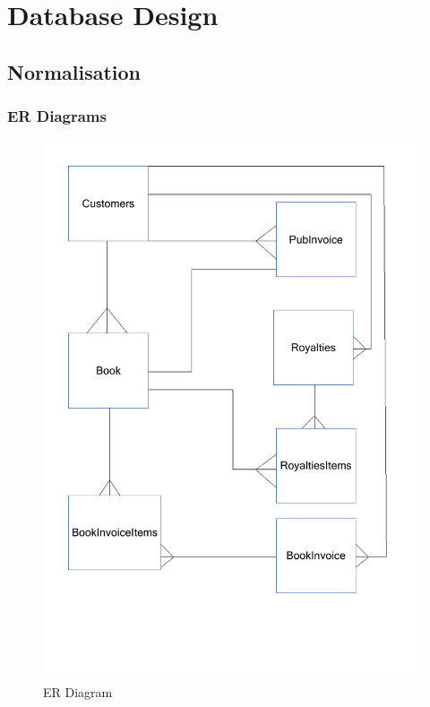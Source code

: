 \section{Database Design}

\subsection{Normalisation}
 
\subsubsection{ER Diagrams}


\begin{figure}[H]
    \caption{ER Diagram} \label{ER_Diagram.pdf}
    \includegraphics[width=\textwidth]{./Design/ER_Diagram.pdf}
\end{figure}


